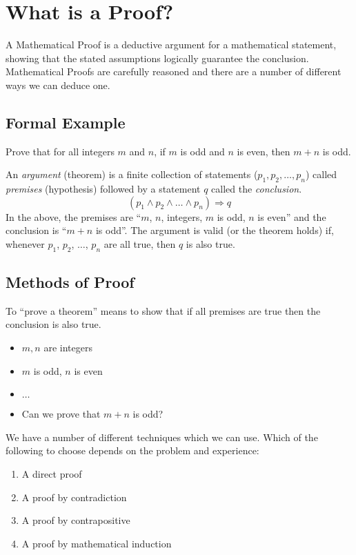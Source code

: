 
\section{What is a Proof?}
A Mathematical Proof is a deductive argument for a mathematical statement, showing that the stated assumptions logically guarantee the conclusion. Mathematical Proofs are carefully reasoned and there are a number of different ways we can deduce one. 

\subsection{Formal Example}

\begin{theorem}
    Prove that for all integers $m$ and $n$, if $m$ is odd and $n$ is even, then $m + n$ is odd.
\end{theorem}

An \textit{argument} (theorem) is a finite collection of statements ($p_1, p_2, \ldots, p_n$) called \textit{premises} (hypothesis) followed by a statement $q$ called the \textit{conclusion}.
\[(p_1 \wedge p_2 \wedge \ldots \wedge p_n) \Rightarrow q\]
In the above, the premises are ``$m$, $n$, integers, $m$ is odd, $n$ is even'' and the conclusion is ``$m+n$ is odd''. The argument is valid (or the theorem holds) if, whenever $p_1$, $p_2$, $\ldots$, $p_n$ are all true, then $q$ is also true.

\subsection{Methods of Proof}
To ``prove a theorem'' means to show that if all premises are true then the conclusion is also true. 
\begin{itemize}
    \item[] $m,n$ are integers
    \item[] $m$ is odd, $n$ is even
    \item[] $\ldots$
    \item[] Can we prove that $m+n$ is odd?
\end{itemize}

We have a number of different techniques which we can use. Which of the following to choose depends on the problem and experience:
\begin{enumerate}
    \item A direct proof
    \item A proof by contradiction
    \item A proof by contrapositive
    \item A proof by mathematical induction
\end{enumerate}


